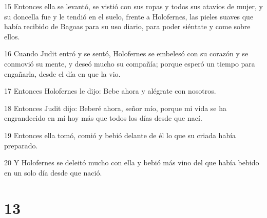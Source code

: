 \par 15 Entonces ella se levantó, se vistió con sus ropas y todos sus atavíos de mujer, y su doncella fue y le tendió en el suelo, frente a Holofernes, las pieles suaves que había recibido de Bagoas para su uso diario, para poder siéntate y come sobre ellos.
\par 16 Cuando Judit entró y se sentó, Holofernes se embelesó con su corazón y se conmovió su mente, y deseó mucho su compañía; porque esperó un tiempo para engañarla, desde el día en que la vio.
\par 17 Entonces Holofernes le dijo: Bebe ahora y alégrate con nosotros.
\par 18 Entonces Judit dijo: Beberé ahora, señor mío, porque mi vida se ha engrandecido en mí hoy más que todos los días desde que nací.
\par 19 Entonces ella tomó, comió y bebió delante de él lo que su criada había preparado.
\par 20 Y Holofernes se deleitó mucho con ella y bebió más vino del que había bebido en un solo día desde que nació.

\chapter{13}

